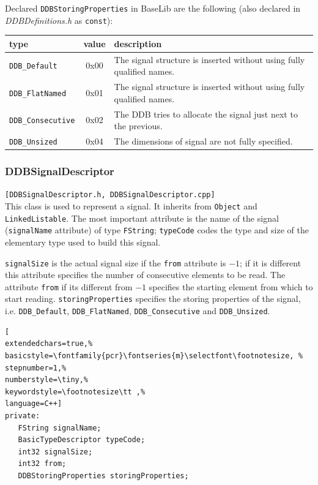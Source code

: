 Declared \texttt{DDBStoringProperties} in BaseLib are the following (also declared in \textit{DDBDefinitions.h} as \texttt{const}):

\begin{table}[!h]
 \begin{center}
  \begin{tabular}{|l|c|l|}
   \hline
type & value & description \\
   \hline
\texttt{DDB\_Default} & 0x00 & The signal structure is inserted without using fully qualified names. \\
\texttt{DDB\_FlatNamed} & 0x01 & The signal structure is inserted without using fully qualified names. \\
\texttt{DDB\_Consecutive} & 0x02 & The DDB tries to allocate the signal just next to the previous. \\
\texttt{DDB\_Unsized} & 0x04 & The dimensions of signal are not fully specified. \\
   \hline
  \end{tabular}
 \end{center}
\end{table}



\subsubsection{DDBSignalDescriptor}
\texttt{[DDBSignalDescriptor.h, DDBSignalDescriptor.cpp]}\\
This class is used to represent a signal. It inherits from \texttt{Object} and \texttt{LinkedListable}. The most important attribute is the name of the signal (\texttt{signalName} attribute) of type \texttt{FString}; \texttt{typeCode} codes the type and size of the elementary type used to build this signal.

 \texttt{signalSize} is the actual signal size if the \texttt{from} attribute is $-1$; if it is different this attribute specifies the number of consecutive elements to be read. The attribute \texttt{from} if its different from $-1$ specifies the starting element from which to start reading. \texttt{storingProperties} specifies the storing properties of the signal, i.e. \texttt{DDB\_Default}, \texttt{DDB\_FlatNamed}, \texttt{DDB\_Consecutive} and \texttt{DDB\_Unsized}.
    
\begin{lstlisting}[
extendedchars=true,%
basicstyle=\fontfamily{pcr}\fontseries{m}\selectfont\footnotesize, %
stepnumber=1,%
numberstyle=\tiny,%
keywordstyle=\footnotesize\tt ,%
language=C++]
private:
   FString signalName;
   BasicTypeDescriptor typeCode;
   int32 signalSize;
   int32 from;
   DDBStoringProperties storingProperties;
\end{lstlisting}


